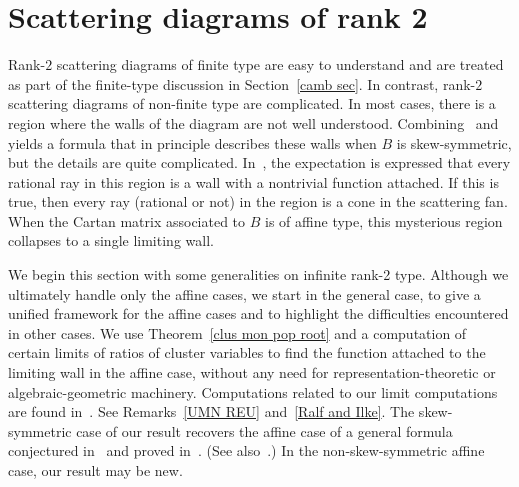 \documentclass[ALCO,ThmDefs,Unicode,epreuves]{cedram}
\begin{document}
\section{Scattering diagrams of rank 2}\label{rk2 sec}

Rank-$2$ scattering diagrams of finite type are easy to understand and are treated as part of the finite-type discussion in Section~\ref{camb sec}.
In contrast, rank-$2$ scattering diagrams of non-finite type are complicated. 
In most cases, there is a region where the walls of the diagram are not well understood.
Combining~\cite[Theorem~1.1]{Bridgeland} and~\cite[Theorem~1.5]{Bridgeland} yields a formula that in principle describes these walls when $B$ is skew-symmetric, but the details are quite complicated.
In~\cite[Example~1.15]{GHKK}, the expectation is expressed that every rational ray in this region is a wall with a nontrivial function attached. 
If this is true, then every ray (rational or not) in the region is a cone in the scattering fan.
When the Cartan matrix associated to $B$ is of affine type, this mysterious region collapses to a single limiting wall.

We begin this section with some generalities on infinite rank-2 type.
Although we ultimately handle only the affine cases, we start in the general case, to give a unified framework for the affine cases and to highlight the difficulties encountered in other cases.
We use Theorem~\ref{clus mon pop root} and a computation of certain limits of ratios of cluster variables to find the function attached to the limiting wall in the affine case, without any need for representation-theoretic or algebraic-geometric machinery.
Computations related to our limit computations are found in~\cite{CaSch,Zhang}.
See Remarks~\ref{UMN REU} and~\ref{Ralf and Ilke}.
The skew-symmetric case of our result recovers the affine case of a general formula conjectured in~\cite[Section~1.4]{KS08} and proved in~\cite[Section~6]{Reineke2}.
(See also~\cite[Example~1.15]{GHKK}.)
In the non-skew-symmetric affine case, our result may be new.
\end{document}
